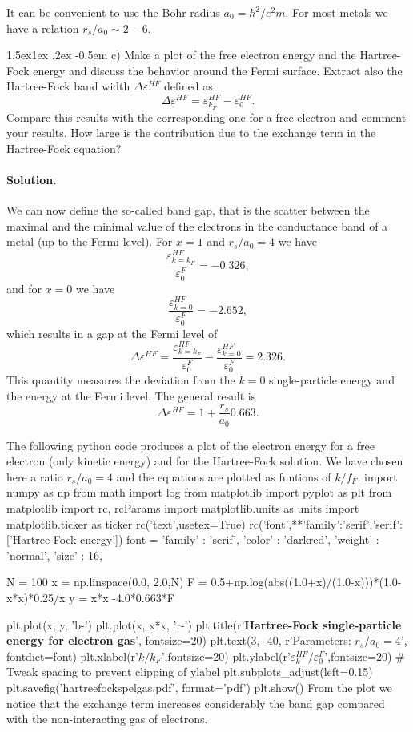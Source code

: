 \documentclass[%
twoside,                 %
final,                   %
10pt]{article}
\makeatletter
\newenvironment{doconceexercise}{}{}
\newcommand\subex{\@startsection{paragraph}{4}{\z@}%
                  {1.5ex\@plus1ex \@minus.2ex}%
                  {-0.5em}%
                  {\normalfont\normalsize\bfseries}}
\makeatother
\begin{document}
\begin{doconceexercise}

It can be convenient to use the Bohr radius $a_0=\hbar^2/e^2m$.
For most metals we have a relation $r_s/a_0\sim 2-6$.

\subex{c)}
Make a plot of the free electron energy and the Hartree-Fock energy and discuss the behavior around the Fermi surface. Extract also   the Hartree-Fock band width $\Delta\varepsilon^{HF}$ defined as
\[ 
\Delta\varepsilon^{HF}=\varepsilon_{k_{F}}^{HF}-
\varepsilon_{0}^{HF}.
\]
Compare this results with the corresponding one for a free electron and comment your results. How large is the contribution due to the exchange term in the Hartree-Fock equation?


\paragraph{Solution.}
We can now define the so-called band gap, that is the scatter between the maximal and the minimal value of the electrons in the conductance band of a metal (up to the Fermi level). 
For $x=1$ and $r_s/a_0=4$ we have 
\[
\frac{\varepsilon_{k=k_F}^{HF} }{\varepsilon_{0}^{F}} = -0.326,
\]
and for $x=0$ we have
\[
\frac{\varepsilon_{k=0}^{HF} }{\varepsilon_{0}^{F}} = -2.652,
\]
which results in a gap at the Fermi level of 
\[
\Delta \varepsilon^{HF} = \frac{\varepsilon_{k=k_F}^{HF} }{\varepsilon_{0}^{F}}-\frac{\varepsilon_{k=0}^{HF} }{\varepsilon_{0}^{F}} = 2.326.
\]
This quantity measures the deviation from the $k=0$ single-particle energy and the energy at the Fermi level.
The general result is 
\[
\Delta \varepsilon^{HF} = 1+\frac{r_s}{a_0}0.663.
\]

The following python code produces a plot of the electron energy for a free electron (only kinetic energy) and 
for the Hartree-Fock solution. We have chosen here a ratio $r_s/a_0=4$ and the equations are plotted as funtions
of $k/f_F$. 
\bpycod
import numpy as np
from math import log
from  matplotlib import pyplot as plt
from matplotlib import rc, rcParams
import matplotlib.units as units
import matplotlib.ticker as ticker
rc('text',usetex=True)
rc('font',**{'family':'serif','serif':['Hartree-Fock energy']})
font = {'family' : 'serif',
        'color'  : 'darkred',
        'weight' : 'normal',
        'size'   : 16,
        }

N = 100
x = np.linspace(0.0, 2.0,N)
F = 0.5+np.log(abs((1.0+x)/(1.0-x)))*(1.0-x*x)*0.25/x
y = x*x -4.0*0.663*F

plt.plot(x, y, 'b-')
plt.plot(x, x*x, 'r-')
plt.title(r'{\bf Hartree-Fock single-particle energy for electron gas}', fontsize=20)     
plt.text(3, -40, r'Parameters: $r_s/a_0=4$', fontdict=font)
plt.xlabel(r'$k/k_F$',fontsize=20)
plt.ylabel(r'$\varepsilon_k^{HF}/\varepsilon_0^F$',fontsize=20)
# Tweak spacing to prevent clipping of ylabel
plt.subplots_adjust(left=0.15)
plt.savefig('hartreefockspelgas.pdf', format='pdf')
plt.show()
\epycod
From the plot we notice that the exchange term increases considerably the band gap
compared with the non-interacting gas of electrons.


\end{doconceexercise}
\end{document}
